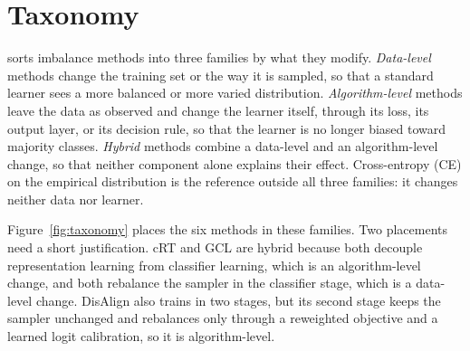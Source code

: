 \documentclass[11pt]{article}
\begin{document}
\section{Taxonomy}
\label{sec:taxonomy}
\citet{krawczyk2016learning} sorts imbalance methods into three families by what they modify. \emph{Data-level} methods change the training set or the way it is sampled, so that a standard learner sees a more balanced or more varied distribution. \emph{Algorithm-level} methods leave the data as observed and change the learner itself, through its loss, its output layer, or its decision rule, so that the learner is no longer biased toward majority classes. \emph{Hybrid} methods combine a data-level and an algorithm-level change, so that neither component alone explains their effect. Cross-entropy (CE) on the empirical distribution is the reference outside all three families: it changes neither data nor learner.

Figure~\ref{fig:taxonomy} places the six methods in these families. Two placements need a short justification. cRT and GCL are hybrid because both decouple representation learning from classifier learning, which is an algorithm-level change, and both rebalance the sampler in the classifier stage, which is a data-level change. DisAlign also trains in two stages, but its second stage keeps the sampler unchanged and rebalances only through a reweighted objective and a learned logit calibration, so it is algorithm-level.
\end{document}
